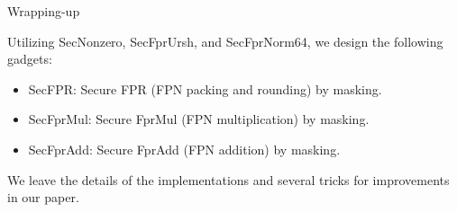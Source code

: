 \begin{frame}{Wrapping-up}

Utilizing {\sf SecNonzero}, {\sf SecFprUrsh}, and {\sf SecFprNorm64}, we design the following gadgets:
\pause
\begin{itemize}
	\item {\sf SecFPR}: Secure FPR (FPN packing and rounding) by masking.
	\pause
	\item {\sf SecFprMul}: Secure FprMul (FPN multiplication) by masking.
	\pause
	\item {\sf SecFprAdd}: Secure FprAdd (FPN addition) by masking.
\end{itemize}
\pause
We leave the details of the implementations and several tricks for improvements in our paper.
\end{frame}